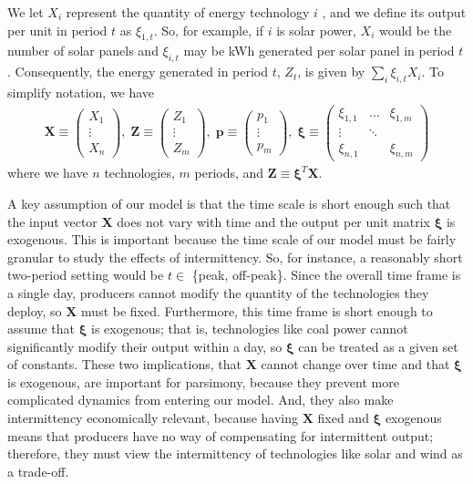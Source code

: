 \documentclass[11pt,a4paper,leqno]{extarticle}
\begin{document}
	We let $X_i$  represent the quantity of energy technology $i$ , and we define its output per unit in period $t$ as $\xi_{1,t}$. So, for example, if $i$ is solar power, $X_i$ would be the number of solar panels and $\xi_{i,t}$ may be kWh generated per solar panel in period $t$. Consequently, the energy generated in period $t$, $Z_t$, is given by $\sum_i \xi_{i,t} X_i$. To simplify notation, we have
	\begin{align}
	\mathbf{X} \equiv \begin{pmatrix}
	X_1\\
	\vdots\\
	X_n
	\end{pmatrix} ,\;
	\mathbf{Z} \equiv \begin{pmatrix}
	Z_1\\
	\vdots\\
	Z_m
	\end{pmatrix} ,\;
	\mathbf{p} \equiv \begin{pmatrix}
	p_1\\
	\vdots\\
	p_m
	\end{pmatrix} ,\;
	\boldsymbol{\xi} \equiv \begin{pmatrix}
	\xi_{1,1} & \dots & \xi_{1,m}\\
	\vdots & \ddots & \\
	\xi_{n,1} &  & \xi_{n,m}
	\end{pmatrix} 
	\end{align}
	where we have $n$ technologies, $m$ periods, and $\mathbf{Z} \equiv \boldsymbol{\xi}^T \mathbf{X}$. 
	
	A key assumption of our model is that the time scale is short enough such that the input vector $\mathbf{X}$ does not vary with time and the output per unit matrix $\boldsymbol{\xi}$ is exogenous. This is important because the time scale of our model must be fairly granular to study the effects of intermittency. So, for instance, a reasonably short two-period setting would be $t \in$ \{peak, off-peak\}. Since the overall time frame is a single day, producers cannot modify the quantity of the technologies they deploy, so $\mathbf{X}$ must be fixed. Furthermore, this time frame is short enough to assume that $\boldsymbol{\xi}$ is exogenous; that is, technologies like coal power cannot significantly modify their output within a day, so $\boldsymbol{\xi}$ can be treated as a given set of constants.  These two implications, that $\mathbf{X}$ cannot change over time and that $\boldsymbol{\xi}$ is exogenous, are important for parsimony, because they prevent more complicated dynamics from entering our model. And, they also make intermittency economically relevant, because having $\mathbf{X}$ fixed and $\boldsymbol{\xi}$ exogenous means that producers have no way of compensating for intermittent output; therefore, they must view the intermittency of technologies like solar and wind as a trade-off. 
	
\end{document}
